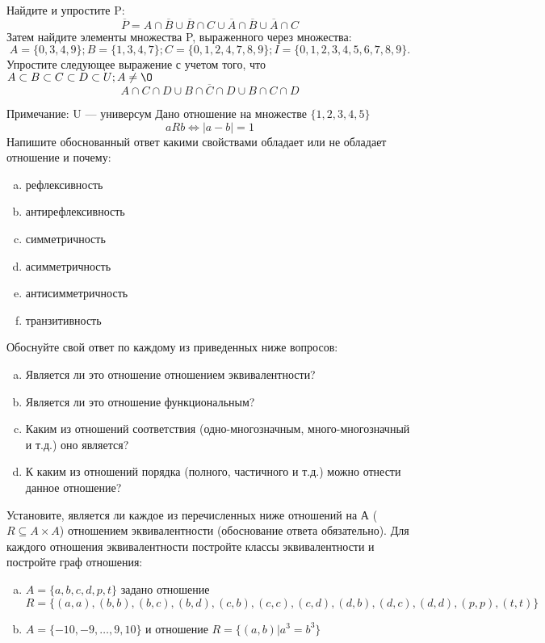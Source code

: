 \documentclass[10pt]{exam}
\begin{document}
\begin{questions}
\question
Найдите и упростите P:
\begin{equation*}
\overline{P} = A \cap \overline{B} \cup \overline{B} \cap C \cup \overline{A} \cap \overline{B} \cup \overline{A} \cap C
\end{equation*}
Затем найдите элементы множества P, выраженного через множества:
\begin{equation*}
A = \{0, 3, 4, 9\}; 
B = \{1, 3, 4, 7\};
C = \{0, 1, 2, 4, 7, 8, 9\};
I = \{0, 1, 2, 3, 4, 5, 6, 7, 8, 9\}.
\end{equation*}\question
Упростите следующее выражение с учетом того, что $A\subset B \subset C \subset D \subset U; A \neq \O$
\begin{equation*}
A \cap C  \cap D \cup B \cap \overline{C} \cap D \cup B \cap C \cap D
\end{equation*}

Примечание: U — универсум\question
Дано отношение на множестве $\{1, 2, 3, 4, 5\}$ 
\begin{equation*}
aRb \iff |a-b| = 1
\end{equation*}
Напишите обоснованный ответ какими свойствами обладает или не обладает отношение и почему:   
\begin{enumerate} [a)]\setcounter{enumi}{0}
\item рефлексивность
\item антирефлексивность
\item симметричность
\item асимметричность
\item антисимметричность
\item транзитивность
\end{enumerate}

Обоснуйте свой ответ по каждому из приведенных ниже вопросов:
\begin{enumerate} [a)]\setcounter{enumi}{0}
    \item Является ли это отношение отношением эквивалентности?
    \item Является ли это отношение функциональным?
    \item Каким из отношений соответствия (одно-многозначным, много-многозначный и т.д.) оно является?
    \item К каким из отношений порядка (полного, частичного и т.д.) можно отнести данное отношение?
\end{enumerate}

\question
Установите, является ли каждое из перечисленных ниже отношений на А ($R \subseteq A \times A$) отношением эквивалентности (обоснование ответа обязательно). Для каждого отношения эквивалентности постройте классы 
эквивалентности и постройте граф отношения:
\begin{enumerate} [a)]\setcounter{enumi}{0}
\item $A = \{a, b, c, d, p, t\}$ задано отношение $R = \{(a, a), (b, b), (b, c), (b, d), (c, b), (c, c), (c, d), (d, b), (d, c), (d, d), (p,p), (t,t)\}$
\item $A = \{-10, -9, … , 9, 10\}$ и отношение $R = \{(a,b)|a^{3} = b^{3}\}$


\end{enumerate}
\end{questions}
\end{document}
